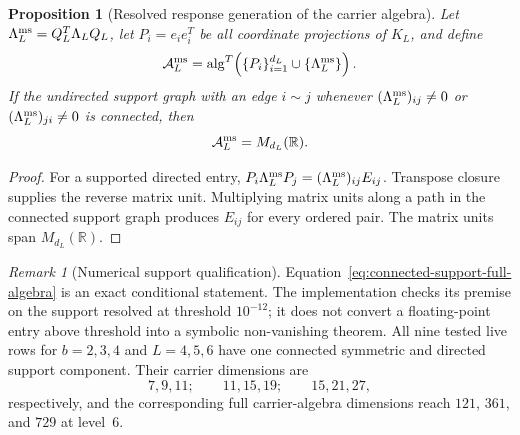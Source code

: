 \documentclass[11pt]{article}
\newtheorem{proposition}[definition]{Proposition}
\theoremstyle{remark}
\newtheorem{remark}[definition]{Remark}
\newcommand{\R}{\mathbb{R}}
\numberwithin{equation}{section}
\begin{document}
\begin{proposition}[Resolved response generation of the carrier algebra]\label{prop:resolved-response-full-algebra}
Let \(\Lambda_L^{\rm ms}=Q_L^T\Lambda_LQ_L\), let \(P_i=e_ie_i^T\) be all coordinate projections of \(K_L\), and define
\begin{equation}
 \mathcal A_L^{\rm ms}
 =\operatorname{alg}^{T}\!\left(\{P_i\}_{i=1}^{d_L}\cup\{\Lambda_L^{\rm ms}\}\right).
 \label{eq:multiscale-response-algebra}
\end{equation}
If the undirected support graph with an edge \(i\!\sim\!j\) whenever
\((\Lambda_L^{\rm ms})_{ij}\neq0\) or \((\Lambda_L^{\rm ms})_{ji}\neq0\)
is connected, then
\begin{equation}
 \mathcal A_L^{\rm ms}=M_{d_L}(\R).
 \label{eq:connected-support-full-algebra}
\end{equation}
\end{proposition}

\begin{proof}
For a supported directed entry,
\(P_i\Lambda_L^{\rm ms}P_j=(\Lambda_L^{\rm ms})_{ij}E_{ij}\).
Transpose closure supplies the reverse matrix unit.  Multiplying matrix units along a path in the connected support graph produces \(E_{ij}\) for every ordered pair.  The matrix units span \(M_{d_L}(\R)\).
\end{proof}

\begin{remark}[Numerical support qualification]
Equation~\eqref{eq:connected-support-full-algebra} is an exact conditional statement.  The implementation checks its premise on the support resolved at threshold \(10^{-12}\); it does not convert a floating-point entry above threshold into a symbolic non-vanishing theorem.  All nine tested live rows for \(b=2,3,4\) and \(L=4,5,6\) have one connected symmetric and directed support component.  Their carrier dimensions are
\[
7,9,11;\qquad 11,15,19;\qquad 15,21,27,
\]
respectively, and the corresponding full carrier-algebra dimensions reach \(121\), \(361\), and \(729\) at level~6.
\end{remark}
\end{document}
